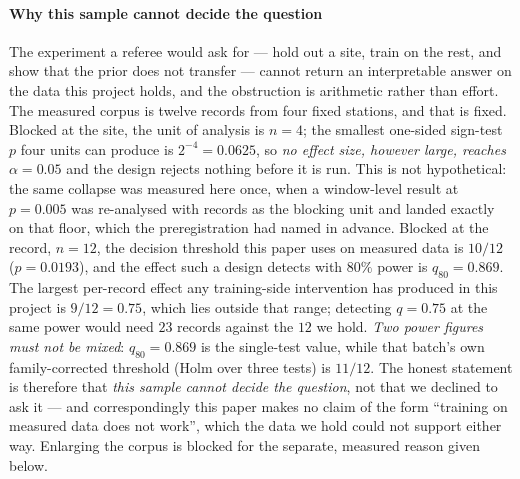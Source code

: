 \documentclass[review]{elsarticle}
\begin{document}
\paragraph{Why this sample cannot decide the question}
The experiment a referee would ask for --- hold out a site, train on the rest, and show
that the prior does not transfer --- cannot return an interpretable answer on the data
this project holds, and the obstruction is arithmetic rather than effort. The measured
corpus is twelve records from four fixed stations, and that is fixed. Blocked at the
site, the unit of analysis is $n = 4$; the smallest one-sided sign-test $p$ four units
can produce is $2^{-4} = 0.0625$, so \emph{no effect size, however large, reaches
$\alpha = 0.05$} and the design rejects nothing before it is run. This is not
hypothetical: the same collapse was measured here once, when a window-level result at
$p = 0.005$ was re-analysed with records as the blocking unit and landed exactly on that
floor, which the preregistration had named in advance. Blocked at the record, $n = 12$,
the decision threshold this paper uses on measured data is $10/12$ ($p = 0.0193$), and
the effect such a design detects with $80\%$ power is $q_{80} = 0.869$. The largest
per-record effect any training-side intervention has produced in this project is
$9/12 = 0.75$, which lies outside that range; detecting $q = 0.75$ at the same power
would need $23$ records against the $12$ we hold. \emph{Two power figures must not be
mixed}: $q_{80} = 0.869$ is the single-test value, while that batch's own
family-corrected threshold (Holm over three tests) is $11/12$. The honest statement is
therefore that \emph{this sample cannot decide the question}, not that we declined to
ask it --- and correspondingly this paper makes no claim of the form ``training on
measured data does not work'', which the data we hold could not support either way.
Enlarging the corpus is blocked for the separate, measured reason given below.

\end{document}
